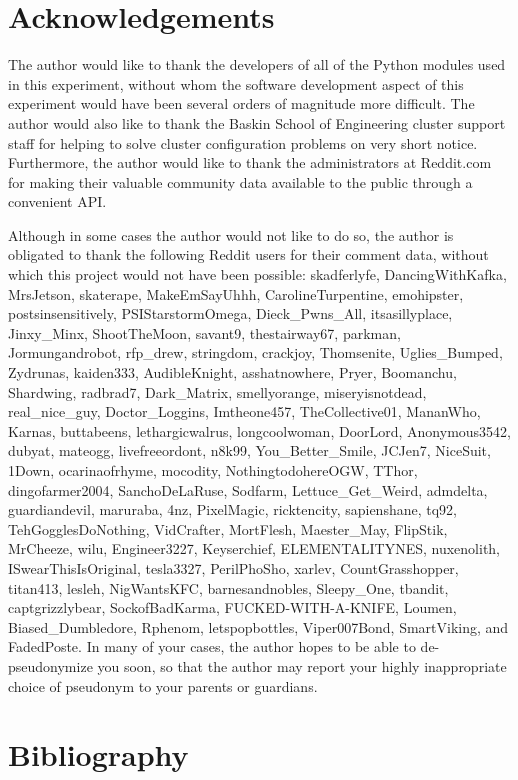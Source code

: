 \documentclass[12pt]{article}
\begin{document}
\section{Acknowledgements}
The author would like to thank the developers of all of the Python modules used in this experiment, without whom the software development aspect of this experiment would have been several orders of magnitude more difficult. The author would also like to thank the Baskin School of Engineering cluster support staff for helping to solve cluster configuration problems on very short notice. Furthermore, the author would like to thank the administrators at Reddit.com for making their valuable community data available to the public through a convenient API.

Although in some cases the author would not like to do so, the author is obligated to thank the following Reddit users for their comment data, without which this project would not have been possible: skadferlyfe, DancingWithKafka, MrsJetson, skaterape, MakeEmSayUhhh, CarolineTurpentine, emohipster, postsinsensitively, PSIStarstormOmega, Dieck\_Pwns\_All, itsasillyplace, Jinxy\_Minx, ShootTheMoon, savant9, thestairway67, parkman, Jormungandrobot, rfp\_drew, stringdom, crackjoy, Thomsenite, Uglies\_Bumped, Zydrunas, kaiden333, AudibleKnight, asshatnowhere, Pryer, Boomanchu, Shardwing, radbrad7, Dark\_Matrix, smellyorange, miseryisnotdead, real\_nice\_guy, Doctor\_Loggins, Imtheone457, TheCollective01, MananWho, Karnas, buttabeens, lethargicwalrus, longcoolwoman, DoorLord, Anonymous3542, dubyat, mateogg, livefreeordont, n8k99, You\_Better\_Smile, JCJen7, NiceSuit, 1Down, ocarinaofrhyme, mocodity, NothingtodohereOGW, TThor, dingofarmer2004, SanchoDeLaRuse, Sodfarm, Lettuce\_Get\_Weird, admdelta, guardiandevil, maruraba, 4nz, PixelMagic, ricktencity, sapienshane, tq92, TehGogglesDoNothing, VidCrafter, MortFlesh, Maester\_May, FlipStik, MrCheeze, wilu, Engineer3227, Keyserchief, ELEMENTALITYNES, nuxenolith, ISwearThisIsOriginal, tesla3327, PerilPhoSho, xarlev, CountGrasshopper, titan413, lesleh, NigWantsKFC, barnesandnobles, Sleepy\_One, tbandit, captgrizzlybear, SockofBadKarma, FUCKED-WITH-A-KNIFE, Loumen, Biased\_Dumbledore, Rphenom, letspopbottles, Viper007Bond, SmartViking, and FadedPoste. In many of your cases, the author hopes to be able to de-pseudonymize you soon, so that the author may report your highly inappropriate choice of pseudonym to your parents or guardians.

\section{Bibliography}


\end{document}

